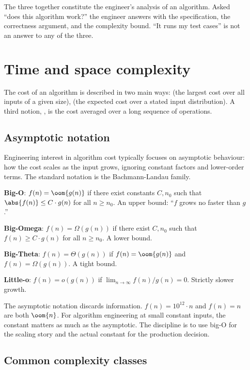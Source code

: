 The three together constitute the engineer's analysis of an algorithm. Asked ``does this algorithm work?'' the engineer answers with the specification, the correctness argument, and the complexity bound. ``It runs my test cases'' is not an answer to any of the three.

\section{Time and space complexity}

The cost of an algorithm is described in two main ways:  (the largest cost over all inputs of a given size),  (the expected cost over a stated input distribution). A third notion, , is the cost averaged over a long sequence of operations.

\subsection{Asymptotic notation}

Engineering interest in algorithm cost typically focuses on asymptotic behaviour: how the cost scales as the input grows, ignoring constant factors and lower-order terms. The standard notation is the Bachmann-Landau family.

\textbf{Big-O}: $f(n) = \oom{g(n)}$ if there exist constants $C, n_0$ such that $\abs{f(n)} \leq C \cdot g(n)$ for all $n \geq n_0$. An upper bound: ``$f$ grows no faster than $g$.''

\textbf{Big-Omega}: $f(n) = \Omega(g(n))$ if there exist $C, n_0$ such that $f(n) \geq C \cdot g(n)$ for all $n \geq n_0$. A lower bound.

\textbf{Big-Theta}: $f(n) = \Theta(g(n))$ if $f(n) = \oom{g(n)}$ and $f(n) = \Omega(g(n))$. A tight bound.

\textbf{Little-o}: $f(n) = o(g(n))$ if $\lim_{n \to \infty} f(n) / g(n) = 0$. Strictly slower growth.

The asymptotic notation discards information. $f(n) = 10^{12} \cdot n$ and $f(n) = n$ are both $\oom{n}$. For algorithm engineering at small constant inputs, the constant matters as much as the asymptotic. The discipline is to use big-O for the scaling story and the actual constant for the production decision.

\subsection{Common complexity classes}

